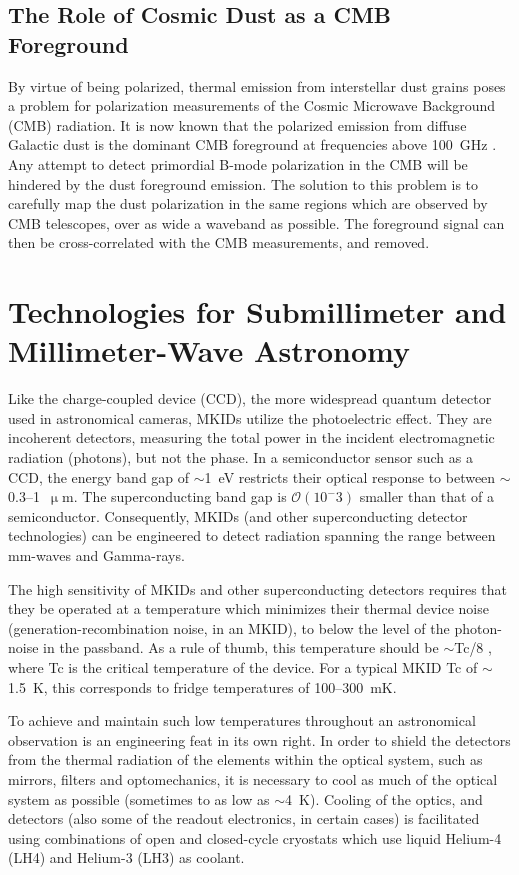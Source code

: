 \subsection{The Role of Cosmic Dust as a CMB Foreground}

By virtue of being polarized, thermal emission from interstellar dust grains poses a problem for polarization measurements of the Cosmic Microwave Background (CMB) radiation. It is now known that the polarized emission from diffuse Galactic dust is the dominant CMB foreground at frequencies above 100~GHz \citep{adam2016planck}. Any attempt to detect primordial B-mode polarization in the CMB will be hindered by the dust foreground emission. The solution to this problem is to carefully map the dust polarization in the same regions which are observed by CMB telescopes, over as wide a waveband as possible. The foreground signal can then be cross-correlated with the CMB measurements, and removed.

\section{Technologies for Submillimeter and Millimeter-Wave Astronomy}

Like the charge-coupled device (CCD), the more widespread quantum detector used in astronomical cameras, MKIDs utilize the photoelectric effect. They are incoherent detectors, measuring the total power in the incident electromagnetic radiation (photons), but not the phase. In a semiconductor sensor such as a CCD, the energy band gap of $\sim$1~eV restricts their optical response to between $\sim$0.3--1~$\upmu$m. The superconducting band gap is $\mathcal{O}(10^-3)$ smaller than that of a semiconductor. Consequently, MKIDs (and other superconducting detector technologies) can be engineered to detect radiation spanning the range between mm-waves and Gamma-rays.

The high sensitivity of MKIDs and other superconducting detectors requires that they be operated at a temperature which minimizes their thermal device noise (generation-recombination noise, in an MKID), to below the level of the photon-noise in the passband. As a rule of thumb, this temperature should be $\sim$\gls{Tc}/8 \citep{mazin2013arcons}, where \gls{Tc} is the critical temperature of the device. For a typical MKID \gls{Tc} of $\sim$1.5~K, this corresponds to fridge temperatures of 100--300~mK.

To achieve and maintain such low temperatures throughout an astronomical observation is an engineering feat in its own right. In order to shield the detectors from the thermal radiation of the elements within the optical system, such as mirrors, filters and optomechanics, it is necessary to cool as much of the optical system as possible (sometimes to as low as $\sim$4~K). Cooling of the optics, and detectors (also some of the readout electronics, in certain cases) is facilitated using combinations of open and closed-cycle cryostats which use liquid Helium-4 (LH4) and Helium-3 (LH3) as coolant.

